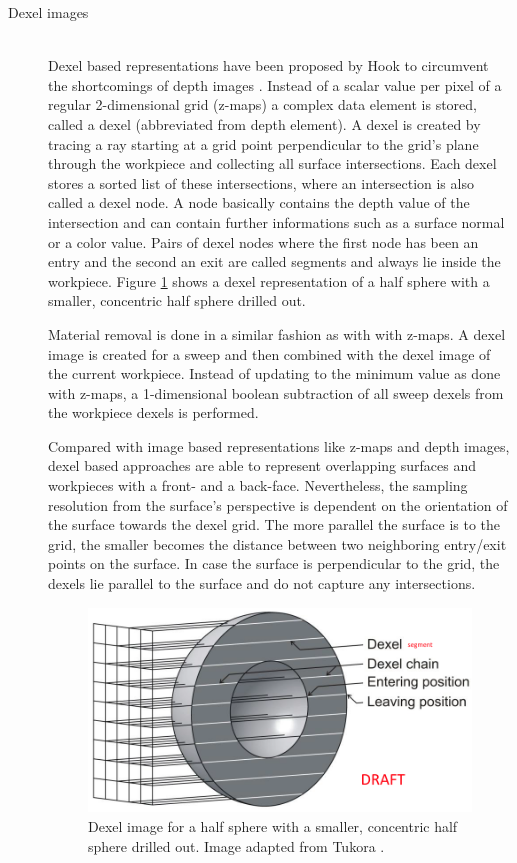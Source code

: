 \begin{description}
	
	\item[Dexel images] \hfill \\
	Dexel based representations have been proposed by Hook to circumvent the shortcomings of depth images \cite{dexel}.
	Instead of a scalar value per pixel of a regular 2-dimensional grid (z-maps) a complex data element is stored, called a dexel (abbreviated from depth element).
	A dexel is created by tracing a ray starting at a grid point perpendicular to the grid's plane through the workpiece and collecting all surface intersections.
	Each dexel stores a sorted list of these intersections, where an intersection is also called a dexel node.
	A node basically contains the depth value of the intersection and can contain further informations such as a surface normal or a color value.
	Pairs of dexel nodes where the first node has been an entry and the second an exit are called segments and always lie inside the workpiece.
	Figure \ref{fig:dexel_image} shows a dexel representation of a half sphere with a smaller, concentric half sphere drilled out.
	
	Material removal is done in a similar fashion as with with z-maps.
	A dexel image is created for a sweep and then combined with the dexel image of the current workpiece.
	Instead of updating to the minimum value as done with z-maps, a 1-dimensional boolean subtraction of all sweep dexels from the workpiece dexels is performed.
	
	Compared with image based representations like z-maps and depth images, dexel based approaches are able to represent overlapping surfaces and workpieces with a front- and a back-face.
	Nevertheless, the sampling resolution from the surface's perspective is dependent on the orientation of the surface towards the dexel grid.
	The more parallel the surface is to the grid, the smaller becomes the distance between two neighboring entry/exit points on the surface.
	In case the surface is perpendicular to the grid, the dexels lie parallel to the surface and do not capture any intersections.
		
	\begin{figure}[h]
		\centering
		\includegraphics[width=\textwidth]{images/dexels}
		\caption{
			Dexel image for a half sphere with a smaller, concentric half sphere drilled out.
			Image adapted from Tukora \cite{virtual_machining_review}.
		}
		\label{fig:dexel_image}
	\end{figure}
		

\end{description}
